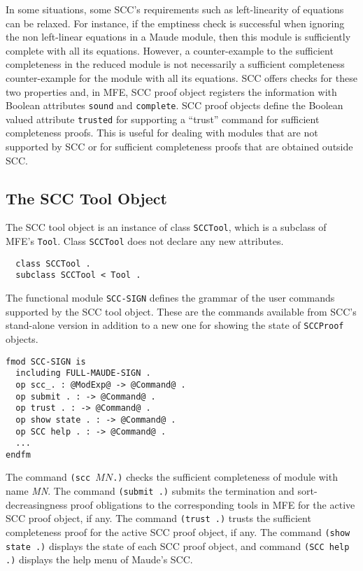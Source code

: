 In some situations, some SCC's requirements such as left-linearity
of equations can be relaxed. For instance, if the emptiness check is successful
when ignoring the non left-linear equations in a Maude module, then 
this module is sufficiently complete with all its equations.
However, a counter-example to the sufficient completeness in the
reduced module is not necessarily a sufficient completeness counter-example 
for the module with all its equations.
SCC offers checks for these two properties and, in MFE, 
SCC proof object registers the information with Boolean attributes 
{\tt sound} and {\tt complete}.
SCC proof objects define the Boolean valued
attribute {\tt trusted} for supporting a ``trust'' command for sufficient completeness proofs.
This is useful for dealing with modules that are not supported by SCC or for sufficient completeness
proofs that are obtained outside SCC.

\subsection{The SCC Tool Object}

The SCC tool object is an instance of class {\tt SCCTool}, which is
a subclass of MFE's {\tt Tool}. 
Class {\tt SCCTool} does not declare any new attributes.

\begin{small}
\begin{verbatim}
  class SCCTool .
  subclass SCCTool < Tool .
\end{verbatim}
\end{small}
%
The functional module {\tt SCC-SIGN}
defines the grammar
of the user commands supported by the SCC tool object.
These are the commands available from SCC's stand-alone version
in addition to a new one for showing the state of {\tt SCCProof} 
objects.

\begin{small}
\begin{verbatim}
fmod SCC-SIGN is
  including FULL-MAUDE-SIGN .
  op scc_. : @ModExp@ -> @Command@ .
  op submit . : -> @Command@ .
  op trust . : -> @Command@ .
  op show state . : -> @Command@ .
  op SCC help . : -> @Command@ .
  ...
endfm
\end{verbatim}
\end{small}
%
The command {\tt (scc $MN$.)} checks the sufficient
completeness of module with name {\it MN}.
The command {\tt (submit .)}
submits the termination and sort-decreasingness
proof obligations to the corresponding tools in MFE
for the active SCC proof object, if any.
The command {\tt (trust .)} trusts the sufficient
completeness proof for the active SCC proof object, if any.
The command {\tt (show state .)} displays the state of each SCC
proof object, and
command {\tt (SCC help .)} displays the help menu of Maude's SCC.


